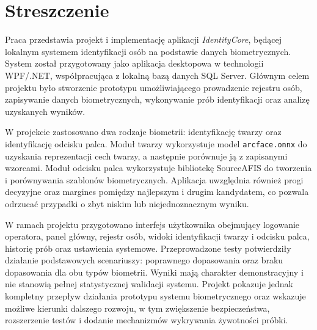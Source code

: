 \chapter*{Streszczenie}
\label{cha:streszczenie-pl}

Praca przedstawia projekt i implementację aplikacji \textit{IdentityCore}, będącej lokalnym systemem identyfikacji osób na podstawie danych biometrycznych. System został przygotowany jako aplikacja desktopowa w technologii WPF/.NET, współpracująca z lokalną bazą danych SQL Server. Głównym celem projektu było stworzenie prototypu umożliwiającego prowadzenie rejestru osób, zapisywanie danych biometrycznych, wykonywanie prób identyfikacji oraz analizę uzyskanych wyników.

\bigskip

W projekcie zastosowano dwa rodzaje biometrii: identyfikację twarzy oraz identyfikację odcisku palca. Moduł twarzy wykorzystuje model \texttt{arcface.onnx} do uzyskania reprezentacji cech twarzy, a następnie porównuje ją z zapisanymi wzorcami. Moduł odcisku palca wykorzystuje bibliotekę SourceAFIS do tworzenia i porównywania szablonów biometrycznych. Aplikacja uwzględnia również progi decyzyjne oraz margines pomiędzy najlepszym i drugim kandydatem, co pozwala odrzucać przypadki o zbyt niskim lub niejednoznacznym wyniku.

\bigskip

W ramach projektu przygotowano interfejs użytkownika obejmujący logowanie operatora, panel główny, rejestr osób, widoki identyfikacji twarzy i odcisku palca, historię prób oraz ustawienia systemowe. Przeprowadzone testy potwierdziły działanie podstawowych scenariuszy: poprawnego dopasowania oraz braku dopasowania dla obu typów biometrii. Wyniki mają charakter demonstracyjny i nie stanowią pełnej statystycznej walidacji systemu. Projekt pokazuje jednak kompletny przepływ działania prototypu systemu biometrycznego oraz wskazuje możliwe kierunki dalszego rozwoju, w tym zwiększenie bezpieczeństwa, rozszerzenie testów i dodanie mechanizmów wykrywania żywotności próbki.